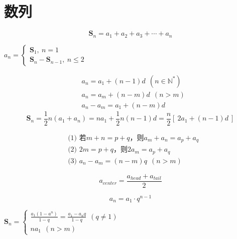 \documentclass[a5paper]{article}
\begin{document}
\section{{\large \textbf{数列}}}

\begin{equation*}
    \textbf{S}_n = a_1 + a_2 + a_3 + \cdots + a_n
\end{equation*}
\begin{center}
	\begin{math}
	    a_n =
        \begin{cases}
            \textbf{S}_1,~n = 1 \\
            \textbf{S}_n - \textbf{S}_{n-1},~n \le 2 
        \end{cases}
    \end{math}
\end{center}

\begin{align*}
    & a_n = a_1 + (n-1)d ~~(n \in \mathbb{N}^*) \\
    & a_n = a_m + (n - m)d ~~(n > m) \\
    & a_n - a_m = a_1 + (n - m)d
\end{align*}
\begin{equation*}
    \textbf{S}_n = \frac{1}{2}n(a_1 + a_n) = na_1 + \frac{1}{2}n(n-1)d = \frac{n}{2}[~2a_1+(n-1)d~]
\end{equation*}

\begin{align*}
    & \text{(1) 若} m+n = p+q \text{，则} a_m + a_n = a_p + a_q \\
    & \text{(2)~} 2m = p+q \text{，则} 2a_m = a_p + a_q \\
    & \text{(3)~} a_n - a_m = (n-m)q ~~(n>m)
\end{align*}

\begin{equation*}
    a_{center} = \frac{a_{head} + a_{tail}}{2}
\end{equation*}

\begin{equation*}
    a_n = a_1 \cdot q^{n-1}
\end{equation*}


\begin{center}
    \begin{math}
        \textbf{S}_n =
        \begin{cases}
            \frac{a_1(1-a^n)}{1-q} = \frac{a_1 - a_{n}q}{1-q} ~~(q \ne 1) \\
            na_1 ~~(n > m)
        \end{cases}
    \end{math}
\end{center}
\end{document}

